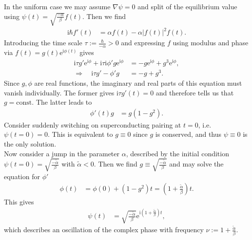 \documentclass[english, parskip=full]{scrartcl}
\newcommand{\kla}{}
\newcommand{\tecxt}{}
\renewcommand{\i}{\text{i}}
\newcommand{\e}{\text{e}}
\begin{document}
In the uniform case we may assume $\nabla\psi = 0$ and split of the equilibrium value using $\psi(t) = \sqrt{\frac{-\alpha}{\beta}} f(t)$.
Then we find
\begin{align}
\i\hbar f'(t) &= \alpha f(t) - \alpha |f(t)|^2 f(t).
\end{align}
Introducing the time scale $\tau := \frac{\hbar}{-\alpha} > 0$ and expressing $f$ using modulus and phase via $f(t) = g(t) \e^{\i\phi(t)}$ gives
\begin{align}
\i\tau g' \e^{\i\phi} + \i\tau \i\phi' g\e^{\i\phi} &= -g\e^{\i\phi} + g^3\e^{\i\phi},\\
\Rightarrow\quad \i\tau g' - \phi' g &= -g + g^3.
\end{align}
Since $g,\phi$ are real functions, the imaginary and real parts of this equation must vanish individually.
The former gives $\i\tau g'(t) = 0$ and therefore tells us that $g = \tecxt\text{const}.$
The latter leads to
\begin{align}
\phi'(t) g &= g \kla\left( 1 - g^2 \right).
\end{align}
Consider suddenly switching on superconducting pairing at $t=0$, i.e. $\psi(t=0) = 0$.
This is equivalent to $g \equiv 0$ since $g$ is conserved, and thus $\psi \equiv 0$ is the only solution.
\\
Now consider a jump in the parameter $\alpha$, described by the initial condition $\psi(t=0) = \sqrt{\frac{-\tilde{\alpha}}{\beta}}$ with $\tilde{\alpha} < 0$.
Then we find $g \equiv \sqrt{\frac{-\tilde{\alpha}}{\beta}}$ and may solve the equation for $\phi'$
\begin{align}
\phi(t) &= \phi(0) + \kla\left( 1 - g^2 \right) t = \kla\left( 1 + \frac{\tilde{\alpha}}{\beta} \right)t.
\end{align}
This gives
\begin{align}
\psi(t) &= \sqrt{\frac{-\tilde{\alpha}}{\beta}} \e^{\i \kla\left( 1 + \frac{\tilde{\alpha}}{\beta} \right) t},
\end{align}
which describes an oscillation of the complex phase with frequency $\nu := 1 + \frac{\tilde{\alpha}}{\beta}$.



\end{document}
